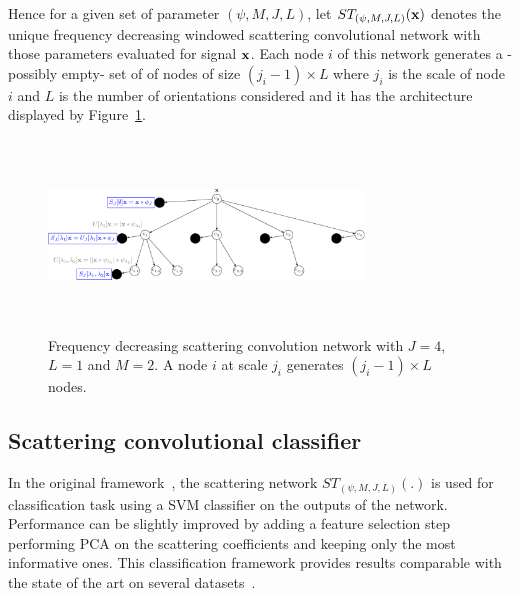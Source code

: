 \documentclass{article}
\begin{document}
    Hence for a given set of parameter $(\psi, M,J,L)$, let $ST_{(\psi, M,J,L)}({\bf x})$ denotes the unique frequency decreasing windowed scattering convolutional network with those parameters evaluated for signal ${\bf x}$. Each node $i$ of this network generates a -possibly empty- set of of nodes of size $(j_{i}-1) \times L$ where $j_{i}$ is the scale of node $i$ and $L$ is the number of orientations considered and it has the architecture displayed by Figure~\ref{fig:SCN 2}.

    \begin{figure}
      \begin{center}
        \includegraphics[width=3.3in, height=2in, keepaspectratio]{ST_freqDec_crop.pdf}
        \caption[Frequency decreasing scattering convolution network.]{\centering  Frequency decreasing scattering convolution network with $J=4$, $L=1$ and $M=2$. A node $i$ at scale $j_{i}$ generates $(j_{i}-1) \times L$ nodes. }
        \label{fig:SCN 2}
      \end{center}
      \vspace{-15pt}
    \end{figure}
    
  \subsection{Scattering convolutional classifier}
    \label{subsec:SCN/SCC}
  
		In the original framework~\cite{bruna2013scattering}, the scattering network $ST_{(\psi, M,J,L)}(.)$ is used for classification task using a SVM classifier on the outputs of the network. Performance can be slightly improved by adding a feature selection step performing PCA on the scattering coefficients and keeping only the most informative ones. This classification framework provides results comparable with the state of the art on several datasets~\cite{bruna2010classification}.
    
    
\end{document}
